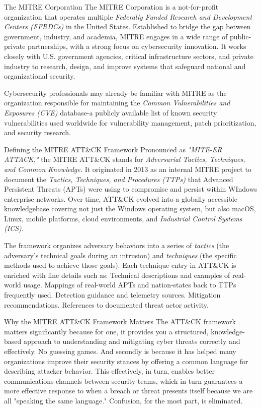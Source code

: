 The MITRE Corporation
The MITRE Corporation is a not-for-profit organization that operates multiple \textit{Federally Funded Research and Development Centers (FFRDCs)} in the United States. Established to bridge the gap between government, industry, and academia, MITRE engages in a wide range of public-private partnerships, with a strong focus on cybersecurity innovation. It works closely with U.S. government agencies, critical infrastructure sectors, and private industry to research, design, and improve systems that safeguard national and organizational security.

Cybersecurity professionals may already be familiar with MITRE as the organization responsible for maintaining the \textit{Common Vulnerabilities and Exposures (CVE)} database-a publicly available list of known security vulnerabilities used worldwide for vulnerability management, patch prioritization, and security research.

Defining the MITRE ATT\&CK Framework
Pronounced as \textit{"MITE-ER ATTACK,"} the MITRE ATT\&CK stands for \textit{Adversarial Tactics, Techniques, and Common Knowledge.} It originated in 2013 as an internal MITRE project to document the \textit{Tactics, Techniques, and Procedures (TTPs)} that Advanced Persistent Threats (APTs) were using to compromise and persist within WIndows enterprise networks. Over time, ATT\&CK evolved into a globally accessible knowledgebase covering not just the Windows operating system, but also macOS, Linux, mobile platforms, cloud environments, and \textit{Industrial Control Systems (ICS).}

The framework organizes adversary behaviors into a series of \textit{tactics} (the adversary's technical goals during an intrusion) and \textit{techniques} (the specific methods used to achieve those goals). Each technique entry in ATT\&CK is enriched with fine details such as:
Technical descriptions and examples of real-world usage.
Mappings of real-world APTs and nation-states back to TTPs frequently used.
Detection guidance and telemetry sources.
Mitigation recommendations.
References to documented threat actor activity.

Why the MITRE ATT\&CK Framework Matters
The ATT\&CK framework matters significantly because for one, it provides you a structured, knowledge-based approach to understanding and mitigating cyber threats correctly and effectively. No guessing games. And secondly is because it has helped many organizations improve their security stances by offering a common language for describing attacker behavior. This effectively, in turn, enables better communications channels between security teams, which in turn guarantees a more effective response to when a breach or threat presents itself because we are all "speaking the same language." Confusion, for the most part, is eliminated.




